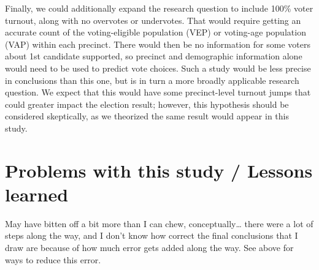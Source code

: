 \documentclass[12pt,twoside]{reedthesis}
\begin{document}
Finally, we could additionally expand the research question to include 100\% voter turnout, along with no overvotes or undervotes. That would require getting an accurate count of the voting-eligible population (VEP) or voting-age population (VAP) within each precinct. There would then be no information for some voters about 1st candidate supported, so precinct and demographic information alone would need to be used to predict vote choices. Such a study would be less precise in conclusions than this one, but is in turn a more broadly applicable research question. We expect that this would have some precinct-level turnout jumps that could greater impact the election result; however, this hypothesis should be considered skeptically, as we theorized the same result would appear in this study.

\hypertarget{problems-with-this-study-lessons-learned}{%
\section{Problems with this study / Lessons learned}\label{problems-with-this-study-lessons-learned}}

May have bitten off a bit more than I can chew, conceptually\ldots{} there were a lot of steps along the way, and I don't know how correct the final conclusions that I draw are because of how much error gets added along the way. See above for ways to reduce this error.

\appendix
\end{document}
